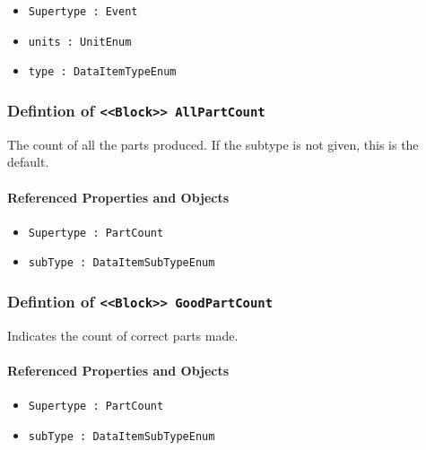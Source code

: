 \begin{itemize}
\item \texttt{Supertype : Event}

\item \texttt{units : UnitEnum}

\item \texttt{type : DataItemTypeEnum}

\end{itemize}
\FloatBarrier
\subsubsection{Defintion of \texttt{<<Block>> AllPartCount}}
  \label{type:AllPartCount}

\FloatBarrier

The count of all the parts produced.  If the subtype is not given, this is the default.

\FloatBarrier
\paragraph{Referenced Properties and Objects}

\begin{itemize}
\item \texttt{Supertype : PartCount}

\item \texttt{subType : DataItemSubTypeEnum}

\end{itemize}
\FloatBarrier
\subsubsection{Defintion of \texttt{<<Block>> GoodPartCount}}
  \label{type:GoodPartCount}

\FloatBarrier

Indicates the count of correct parts made.

\FloatBarrier
\paragraph{Referenced Properties and Objects}

\begin{itemize}
\item \texttt{Supertype : PartCount}

\item \texttt{subType : DataItemSubTypeEnum}

\end{itemize}
\FloatBarrier
